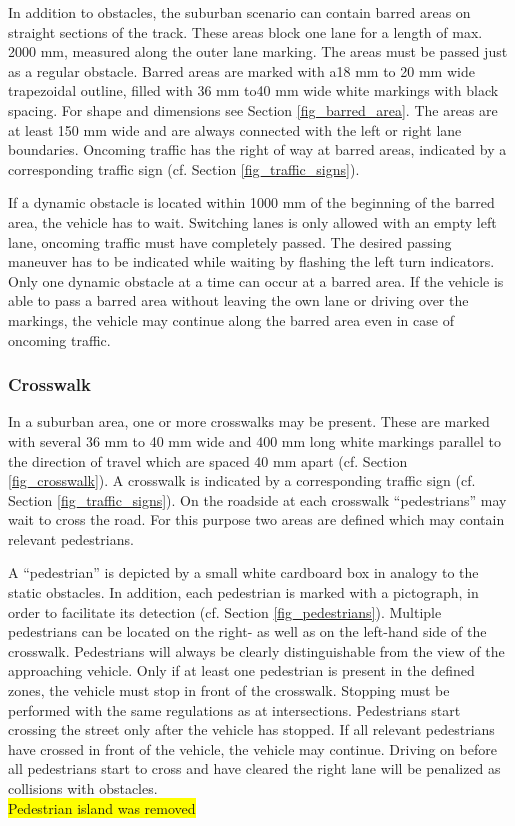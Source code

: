 \documentclass[a4paper]{report}
\begin{document}
{In addition to obstacles, the suburban scenario can contain barred areas on straight sections of the track. These areas block one lane for a length of max. 2000 mm, measured along the outer lane marking. The areas must be passed just as a regular obstacle. Barred areas are marked with a18 mm to 20 mm wide trapezoidal outline, filled with 36 mm to40 mm wide white markings with black spacing. For shape and dimensions see Section \ref{fig_barred_area}. The areas are at least 150 mm wide and are always connected with the left or right lane boundaries. Oncoming traffic has the right of way at barred areas, indicated by a corresponding traffic sign (cf. Section \ref{fig_traffic_signs}). 

If a dynamic obstacle is located within 1000 mm of the beginning of the barred area, the vehicle has to wait. Switching lanes is only allowed with an empty left lane, oncoming traffic must have completely passed. The desired passing maneuver has to be indicated while waiting by flashing the left turn indicators. Only one dynamic obstacle at a time can occur at a barred area. If the vehicle is able to pass a barred area without leaving the own lane or driving over the markings, the vehicle may continue along the barred area even in case of oncoming traffic. 

\subsubsection{Crosswalk}

In a suburban area, one or more crosswalks may be present. These are marked with several 36 mm to 40 mm wide and 400 mm long white markings parallel to the direction of travel which are spaced 40 mm apart (cf. Section \ref{fig_crosswalk}). A crosswalk is indicated by a corresponding traffic sign (cf. Section \ref{fig_traffic_signs}). On the roadside at each crosswalk “pedestrians” may wait to cross the road. For this purpose two areas are defined which may contain relevant pedestrians. 

A “pedestrian” is depicted by a small white cardboard box in analogy to the static obstacles. In addition, each pedestrian is marked with a pictograph, in order to facilitate its detection (cf. Section \ref{fig_pedestrians}). Multiple pedestrians can be located on the right- as well as on the left-hand side of the crosswalk. Pedestrians will always be clearly distinguishable from the view of the approaching vehicle. Only if at least one pedestrian is present in the defined zones, the vehicle must stop in front of the crosswalk. Stopping must be performed with the same regulations as at intersections. Pedestrians start crossing the street only after the vehicle has stopped. If all relevant pedestrians have crossed in front of the vehicle, the vehicle may continue. Driving on before all pedestrians start to cross and have cleared the right lane will be penalized as collisions with obstacles. 
\bigskip\\
\colorbox{yellow}{Pedestrian island was removed} 

}
\end{document}
